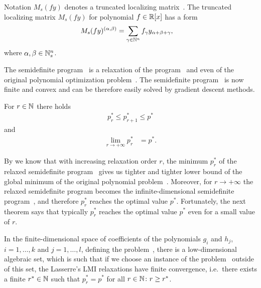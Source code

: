 Notation $M_s(fy)$ denotes a truncated localizing matrix~\cite[page 53]{SOS}.
The truncated localizing matrix $M_s(fy)$ for polynomial $f\in\mathbb{R}[x]$ has a form
\begin{align}
  M_s(fy)^{(\alpha,\beta)} &= \sum_{\gamma\in\mathbb{N}^n}f_\gamma y_{\alpha+\beta+\gamma},
\end{align}
where $\alpha, \beta\in\mathbb{N}^n_s$.

The semidefinite program~ is a relaxation of the program~ and even of the original polynomial optimization problem~.
The semidefinite program~ is now finite and convex and can be therefore easily solved by gradient descent methods.

\begin{theorem}
  For $r\in\mathbb{N}$ there holds
  \begin{align}
    p^*_r \leq p^*_{r+1} \leq p^*
  \end{align}
  and
  \begin{align}
    \lim_{r\rightarrow+\infty}p^*_r &= p^*.
  \end{align}
\end{theorem}

By  we know that with increasing relaxation order $r$, the minimum $p_r^*$ of the relaxed semidefinite program~ gives us tighter and tighter lower bound of the global minimum of the original polynomial problem~.
Moreover, for $r\rightarrow+\infty$ the relaxed semidefinite program becomes the infinite-dimensional semidefinite program~, and therefore $p_r^*$ reaches the optimal value $p^*$.
Fortunately, the next theorem says that typically $p_r^*$ reaches the optimal value $p^*$ even for a small value of $r$.

\begin{theorem}
  In the finite-dimensional space of coefficients of the polynomials $g_i$ and $h_j$, $i = 1, \ldots, k$ and $j = 1, \ldots, l$, defining the problem~, there is a low-dimensional algebraic set, which is such that if we choose an instance of the problem~ outside of this set, the Lasserre's LMI relaxations have finite convergence, i.e.\ there exists a finite $r^*\in\mathbb{N}$ such that $p^*_r=p^*$ for all $r\in\mathbb{N}\colon r\geq r^*$.
\end{theorem}

